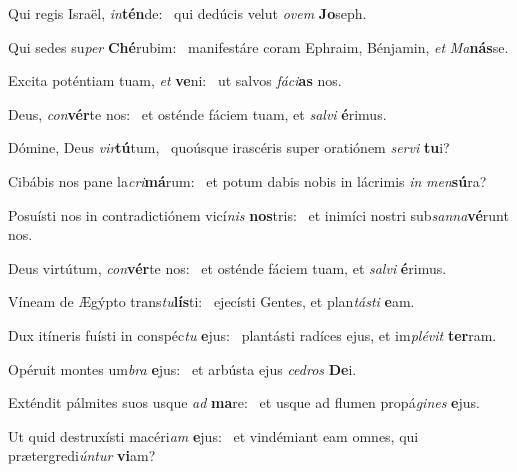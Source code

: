 \item Qui regis Israël, \textit{in}\textbf{tén}de:~\psstar{} qui dedúcis velut \textit{ovem} \textbf{Jo}seph.

\item Qui sedes su\textit{per} \textbf{Ché}rubim:~\psstar{} manifestáre coram Ephraim, Bénjamin, \textit{et} \textit{Ma}\textbf{nás}se.

\item Excita poténtiam tuam, \textit{et} \textbf{ve}ni:~\psstar{} ut salvos \textit{fáci}\textbf{as} nos.

\item Deus, \textit{con}\textbf{vér}te nos:~\psstar{} et osténde fáciem tuam, et \textit{salvi} \textbf{é}rimus.

\item Dómine, Deus \textit{vir}\textbf{tú}tum,~\psstar{} quoúsque irascéris super oratiónem \textit{servi} \textbf{tu}i?

\item Cibábis nos pane la\textit{cri}\textbf{má}rum:~\psstar{} et potum dabis nobis in lácrimis \textit{in} \textit{men}\textbf{sú}ra?

\item Posuísti nos in contradictiónem vicí\textit{nis} \textbf{nos}tris:~\psstar{} et inimíci nostri sub\textit{sanna}\textbf{vé}runt nos.

\item Deus virtútum, \textit{con}\textbf{vér}te nos:~\psstar{} et osténde fáciem tuam, et \textit{salvi} \textbf{é}rimus.

\item Víneam de Ægýpto trans\textit{tu}\textbf{lís}ti:~\psstar{} ejecísti Gentes, et plan\textit{tásti} \textbf{e}am.

\item Dux itíneris fuísti in conspéc\textit{tu} \textbf{e}jus:~\psstar{} plantásti radíces ejus, et im\textit{plévit} \textbf{ter}ram.

\item Opéruit montes um\textit{bra} \textbf{e}jus:~\psstar{} et arbústa ejus \textit{cedros} \textbf{De}i.

\item Exténdit pálmites suos usque \textit{ad} \textbf{ma}re:~\psstar{} et usque ad flumen propá\textit{gines} \textbf{e}jus.

\item Ut quid destruxísti macéri\textit{am} \textbf{e}jus:~\psstar{} et vindémiant eam omnes, qui prætergredi\textit{úntur} \textbf{vi}am?

